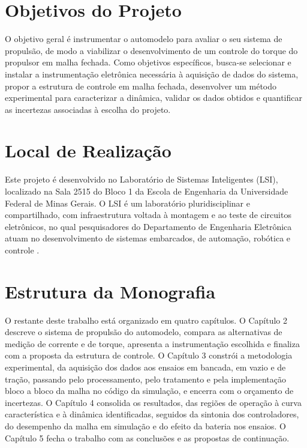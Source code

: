 \section{Objetivos do Projeto}
\label{sec:objetivos}

O objetivo geral é instrumentar o automodelo para
avaliar o seu sistema de propulsão, de modo a viabilizar o desenvolvimento de
um controle do torque do propulsor em malha fechada. Como objetivos específicos, busca-se
selecionar e instalar a instrumentação eletrônica necessária à aquisição de dados do sistema,
propor a estrutura de controle em malha fechada, desenvolver um método experimental para 
caracterizar a dinâmica, validar os dados obtidos e
quantificar as incertezas associadas à escolha do projeto.

\section{Local de Realização}
\label{sec:local}

Este projeto é desenvolvido no Laboratório de Sistemas Inteligentes (LSI), localizado na
Sala 2515 do Bloco 1 da Escola de Engenharia da Universidade Federal de Minas Gerais. O LSI é
um laboratório pluridisciplinar e compartilhado, com infraestrutura voltada à montagem e ao
teste de circuitos eletrônicos, no qual pesquisadores do Departamento de Engenharia Eletrônica
atuam no desenvolvimento de sistemas embarcados, de automação, robótica e controle
\cite{delt_site}.

\section{Estrutura da Monografia}
\label{sec:estrutura}

O restante deste trabalho está organizado em quatro capítulos. O Capítulo 2 descreve o
sistema de propulsão do automodelo, compara as alternativas de medição de corrente e de
torque, apresenta a instrumentação escolhida e finaliza com a
proposta da estrutura de controle. O Capítulo 3 constrói a metodologia experimental, da aquisição
dos dados aos ensaios em bancada, em vazio e de tração, passando pelo processamento, pelo
tratamento e pela implementação bloco a bloco da malha no código da simulação, e encerra com
o orçamento de incertezas. O Capítulo 4 consolida os resultados, das regiões de operação à
curva característica e à dinâmica identificadas, seguidos da sintonia dos controladores, do
desempenho da malha em simulação e do efeito da bateria nos ensaios. O Capítulo 5 fecha o
trabalho com as conclusões e as propostas de continuação.

